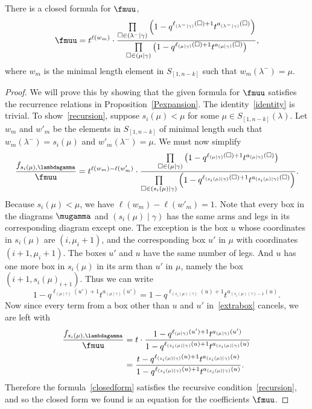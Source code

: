 \begin{prop}
There is a closed formula for $\fmuu$,
\begin{equation}\label{closedform} \fmuu = t^{\ell(w_m)} \cdot \frac{\prod\limits_{\square \in (\lambda^- \mid \gamma)} \left( 1-q^{\ell_{(\lambda^- \mid \gamma)} (\square)+1} t^{a_{(\lambda^- \mid \gamma)} (\square)} \right)}{\prod\limits_{\square \in (\mu \mid \gamma)} \left( 1-q^{\ell_{(\mu \mid \gamma)} (\square)+1} t^{a_{(\mu \mid \gamma)} (\square)} \right) }, \end{equation}
where $w_m$ is the minimal length element in $S_{[1,n-k]}$ such that $w_m(\lambda^-)=\mu$.
\end{prop}
\begin{proof}
We will prove this by showing that the given formula for $\fmuu$ satisfies the recurrence relations in Proposition~\ref{Pexpansion}. The identity~\eqref{identity} is trivial. To show~\eqref{recursion}, suppose $s_i(\mu)<\mu$ for some $\mu \in S_{[1,n-k]}(\lambda)$. Let $w_m$ and $w'_m$ be the elements in $S_{[1,n-k]}$ of minimal length such that $w_m(\lambda^-)=s_i(\mu)$ and $w'_m(\lambda^-)=\mu$. We must now simplify
\begin{equation}\label{extrabox}\frac{f_{s_i(\mu),\lambdagamma}}{\fmuu} = t^{\ell(w_m)-\ell(w'_m)} \cdot \frac{\prod\limits_{\square \in (\mu \mid \gamma)} \left( 1-q^{\ell_{(\mu\mid \gamma)} (\square)+1} t^{a_{(\mu \mid \gamma)} (\square)} \right)}{\prod\limits_{\square \in (s_i(\mu) \mid \gamma)} \left( 1-q^{\ell_{(s_i(\mu) \mid \gamma)} (\square)+1} t^{a_{(s_i(\mu) \mid \gamma)} (\square)} \right) }. \end{equation}
Because $s_i(\mu)<\mu$, we have $\ell(w_m)-\ell(w'_m)=1$. Note that every box in the diagrams $\mugamma$ and $(s_i(\mu)\mid \gamma)$ has the same arms and legs in its corresponding diagram except one. The exception is the box $u$ whose coordinates in $s_i(\mu)$ are $(i,\mu_i+1)$, and the corresponding box $u'$ in $\mu$ with coordinates $(i+1,\mu_i+1)$. The boxes $u'$ and $u$ have the same number of legs. And $u$ has one more box in $s_i(\mu)$ in its arm than $u'$ in $\mu$, namely the box $(i+1,s_i(\mu)_{i+1})$. Thus we can write
\[ 1-q^{\ell_{(\mu\mid \gamma)} (u')+1} t^{a_{(\mu \mid \gamma)} (u')}=1-q^{\ell_{(s_i(\mu)\mid \gamma)} (u)+1} t^{a_{(s_i(\mu) \mid \gamma)-1} (u)}.\]
Now since every term from a box other than $u$ and $u'$ in~\eqref{extrabox} cancels, we are left with
\begin{align*} \frac{f_{s_i(\mu),\lambdagamma}}{\fmuu} &= t \cdot \frac{ 1-q^{\ell_{(\mu\mid \gamma)} (u')+1} t^{a_{(\mu \mid \gamma)} (u')}}{ 1-q^{\ell_{(s_i(\mu) \mid \gamma)} (u)+1} t^{a_{(s_i(\mu) \mid \gamma)} (u)} }\\
&= \frac{t-q^{\ell_{(s_i(\mu) \mid \gamma)} (u)+1} t^{a_{(s_i(\mu) \mid \gamma)} (u)}}{1-q^{\ell_{(s_i(\mu) \mid \gamma)} (u)+1} t^{a_{(s_i(\mu) \mid \gamma)} (u)}}.\end{align*}
Therefore the formula~\eqref{closedform} satisfies the recursive condition~\eqref{recursion}, and so the closed form we found is an equation for the coefficients $\fmuu$. \end{proof}







